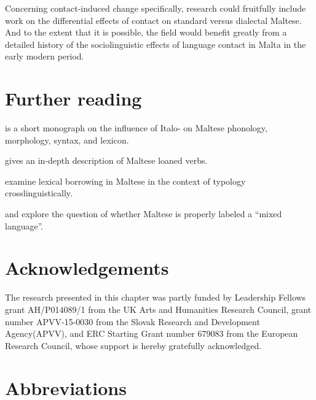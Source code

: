 \documentclass[output=paper]{langsci/langscibook}
\begin{document}
Concerning contact-induced change specifically,  research could fruitfully include  work on the differential effects of contact on standard versus dialectal Maltese. And to the extent that it is possible, the field would benefit greatly from a detailed history of the sociolinguistic effects of language contact in Malta in the early modern period.

\section*{Further reading}
\begin{furtherreading}
\item \cite{krier1976} is a short monograph on the influence of Italo- on Maltese phonology, morphology, syntax, and lexicon.
\item \cite{mifsudloanverbs} gives an in-depth description of Maltese loaned verbs.
\item \cite{comriespagnol2016} examine lexical borrowing in Maltese in the context of  typology crosslinguistically.
\item \cite{Drewes1994} and \cite{stolz2003} explore the question of whether Maltese is properly labeled a ``mixed language''.
\end{furtherreading}

\section*{Acknowledgements}
The research presented in this chapter was partly funded by Leadership Fellows grant AH/P014089/1 from the UK Arts and Humanities Research Council, grant number APVV-15-0030 from the Slovak Research and Development Agency\linebreak\relax(APVV), and ERC Starting Grant number 679083 from the European Research Council, whose support is hereby gratefully acknowledged.

\section*{Abbreviations}
\end{document}
